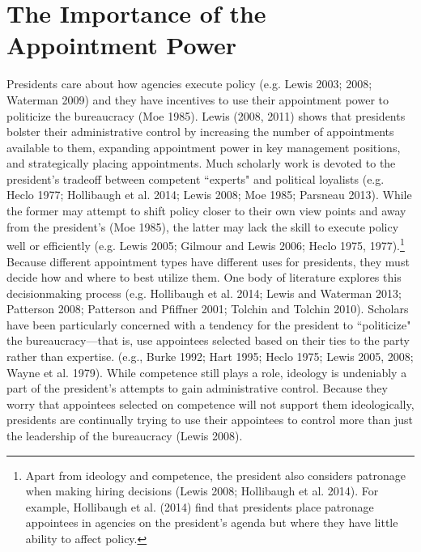 \documentclass[12pt]{article}
\begin{document}
\section*{The Importance of the Appointment Power}
Presidents care about how agencies execute policy (e.g. Lewis 2003; 2008; Waterman 2009) and they have incentives to use their appointment power to politicize the bureaucracy (Moe 1985). Lewis (2008, 2011) shows that presidents bolster their administrative control by increasing the number of appointments available to them, expanding appointment power in key management positions, and strategically placing appointments. Much scholarly work is devoted to the president's tradeoff between competent ``experts" and political loyalists (e.g. Heclo 1977; Hollibaugh et al. 2014; Lewis 2008; Moe 1985; Parsneau 2013). While the former may attempt to shift policy closer to their own view points and away from the president's (Moe 1985), the latter may lack the skill to execute policy well or efficiently (e.g. Lewis 2005; Gilmour and Lewis 2006; Heclo 1975, 1977).\footnote{Apart from ideology and competence, the president also considers patronage when making hiring decisions (Lewis 2008; Hollibaugh et al. 2014). For example, Hollibaugh et al. (2014) find that presidents place patronage appointees in agencies on the president's agenda but where they have little ability to affect policy.} Because different appointment types have different uses for presidents, they must decide how and where to best utilize them. One body of literature explores this decisionmaking process (e.g. Hollibaugh et al. 2014; Lewis and Waterman 2013; Patterson 2008; Patterson and Pfiffner 2001; Tolchin and Tolchin 2010). Scholars have been particularly concerned with a tendency for the president to ``politicize" the bureaucracy---that is, use appointees selected based on their ties to the party rather than expertise. (e.g., Burke 1992; Hart 1995; Heclo 1975; Lewis 2005, 2008; Wayne et al. 1979). While competence still plays a role, ideology is undeniably a part of the president's attempts to gain administrative control. Because they worry that appointees selected on competence will not support them ideologically, presidents are continually trying to use their appointees to control more than just the leadership of the bureaucracy (Lewis 2008).
\end{document}
